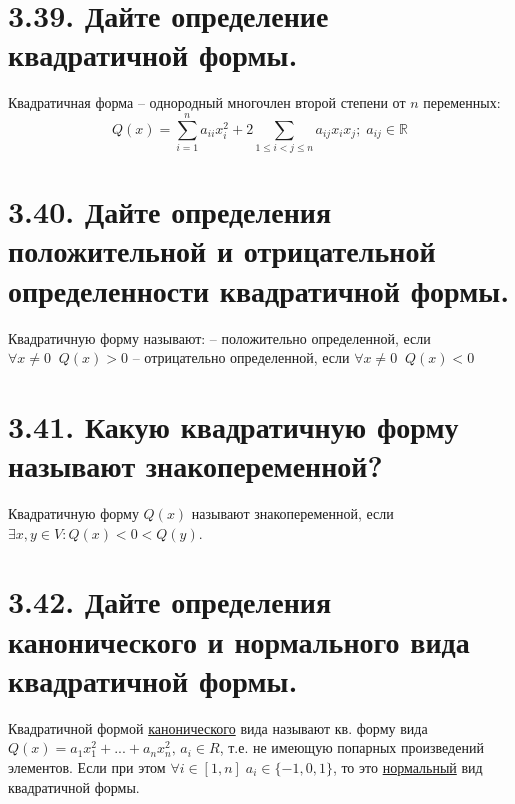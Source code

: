 \documentclass{article}
\begin{document}
\section*{\LARGE 3.39. Дайте определение квадратичной формы.}
Квадратичная форма -- однородный многочлен второй степени от $n$ переменных:
$$Q(x) = \sum_{i = 1}^n a_{ii}x_i^2 + 2\sum_{1 \le i < j \le n} a_{ij}x_ix_j; \; a_{ij} \in \mathbb{R}$$

\section*{\LARGE 3.40. Дайте определения положительной и отрицательной определенности квадратичной формы.}
Квадратичную форму называют:
\newline\indent -- положительно определенной, если $\forall x \ne 0 \;\; Q(x) > 0$ 
\newline\indent -- отрицательно определенной, если $\forall x \ne 0 \;\; Q(x) < 0$ 

\section*{\LARGE 3.41. Какую квадратичную форму называют знакопеременной?}
Квадратичную форму $Q(x)$ называют знакопеременной, если 
\newline $\exists x,y \in V : Q(x) < 0 < Q(y)$.

\section*{\LARGE 3.42. Дайте определения канонического и нормального вида квадратичной формы.}
Квадратичной формой \underline{канонического} вида называют кв. форму вида 
\newline $Q(x) = a_1x_1^2 + ... + a_nx_n^2,\, a_i \in R$, т.е. не имеющую попарных произведений элементов. Если при этом $\forall i \in [1, n] \; a_i \in \{-1, 0, 1\}$, то это \underline{нормальный} вид квадратичной формы.

\end{document}

